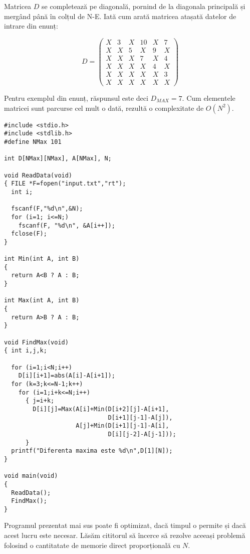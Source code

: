 Matricea $D$ se completează pe diagonală, pornind de la diagonala principală
și mergând până în colțul de N-E. Iată cum arată matricea atașată datelor de
intrare din enunț:

\begin{equation}
  D =
  \begin{pmatrix}
    X & 3 & X & 10 & X & 7 \\
    X & X & 5 & X & 9 & X \\
    X & X & X & 7 & X & 4 \\
    X & X & X & X & 4 & X \\
    X & X & X & X & X & 3 \\
    X & X & X & X & X & X
  \end{pmatrix}
\end{equation}

Pentru exemplul din enunț, răspunsul este deci $D_{MAX}=7$. Cum elementele
matricei sunt parcurse cel mult o dată, rezultă o complexitate de $O(N^2)$.

\begin{verbatim}
#include <stdio.h>
#include <stdlib.h>
#define NMax 101

int D[NMax][NMax], A[NMax], N;

void ReadData(void)
{ FILE *F=fopen("input.txt","rt");
  int i;

  fscanf(F,"%d\n",&N);
  for (i=1; i<=N;)
    fscanf(F, "%d\n", &A[i++]);
  fclose(F);
}

int Min(int A, int B)
{
  return A<B ? A : B;
}

int Max(int A, int B)
{
  return A>B ? A : B;
}

void FindMax(void)
{ int i,j,k;

  for (i=1;i<N;i++)
    D[i][i+1]=abs(A[i]-A[i+1]);
  for (k=3;k<=N-1;k++)
    for (i=1;i+k<=N;i++)
      { j=i+k;
        D[i][j]=Max(A[i]+Min(D[i+2][j]-A[i+1],
                             D[i+1][j-1]-A[j]),
                    A[j]+Min(D[i+1][j-1]-A[i],
                             D[i][j-2]-A[j-1]));
      }
  printf("Diferenta maxima este %d\n",D[1][N]);
}

void main(void)
{
  ReadData();
  FindMax();
}
\end{verbatim}

Programul prezentat mai sus poate fi optimizat, dacă timpul o permite și dacă
acest lucru este necesar. Lăsăm cititorul să încerce să rezolve aceeași
problemă folosind o cantitatate de memorie direct proporțională cu $N$.

